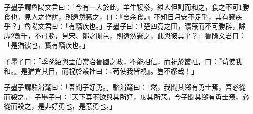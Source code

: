 \begin{pinyinscope}
子墨子謂魯陽文君曰：「今有一人於此，羊牛犓豢，維人但割而和之，食之不可1勝食也。見人之作餅，則還然竊之，曰：『舍余食。』不知日月安不足乎，其有竊疾乎？」魯陽文君曰：「有竊疾也。」子墨子曰：「楚四竟之田，曠蕪而不可勝辟，謼虛2數千，不可勝，見宋、鄭之閒邑，則還然竊之，此與彼異乎？」魯陽文君曰：「是猶彼也，實有竊疾也。」

子墨子曰：「季孫紹與孟伯常治魯國之政，不能相信，而祝於叢社，曰：『苟使我和。』是猶弇其目，而祝於叢社曰：『苟使我皆視』。豈不繆哉！」

子墨子謂駱滑氂曰：「吾聞子好勇。」駱滑氂曰：「然，我聞其鄉有勇士焉，吾必從而殺之。」子墨子曰：「天下莫不欲與其所好，度其所惡。今子聞其鄉有勇士焉，必從而殺之，是非好勇也，是惡勇也。」


\end{pinyinscope}